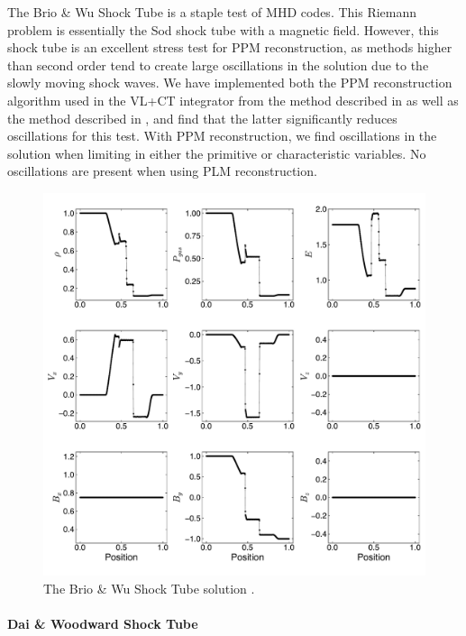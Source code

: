 \documentclass[modern, linenumbers]{aastex631}
\newcommand*{\img}[1]{%
    \raisebox{-.3\baselineskip}{%
        \texttt{[image: \#1]}%
    }%
}
\begin{document}
The Brio \& Wu Shock Tube \citep{brio_wu_1988} is a staple test of MHD codes. This Riemann problem is essentially the Sod shock tube \citep{sod_1978} with a magnetic field. However, this shock tube is an excellent stress test for PPM reconstruction, as methods higher than second order tend to create large oscillations in the solution due to the slowly moving shock waves. We have implemented both the PPM reconstruction algorithm used in the VL+CT integrator from the method described in \cite{stone_athena_2008} as well as the method described in \cite{felker_2018}, and find that the latter significantly reduces oscillations for this test. With PPM reconstruction, we find  oscillations in the solution when limiting in either the primitive or characteristic variables. No oscillations are present when using PLM reconstruction.

\begin{figure}[ht!]
    \includegraphics[width=\linewidth]{b&w.pdf}
    \caption{The Brio \& Wu Shock Tube solution \citep{brio_wu_1988}.
    \href{https://github.com/bcaddy/caddy-et-al-2023/blob/4c9c5ef905902e54e50943d0a261bd5b08342225/python/shock-tubes.py}{\img{github.png}}}
    \label{fig:brio-and-wu}
\end{figure}

\paragraph{Dai \& Woodward Shock Tube}
\end{document}
